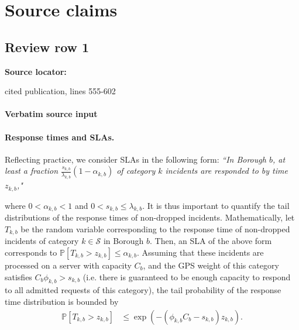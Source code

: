 \documentclass[10pt]{article}
\begin{document}
\clearpage
\hypertarget{source-claim-6542200f731a263b}{}
\hypertarget{source-section-f10b5f68e4acf3dc}{}
\section*{Source claims}
\subsection*{Review row 1}
\textbf{Source locator:} {\footnotesize\raggedright cited publication, lines 555-\allowbreak{}602\par}
\paragraph{Verbatim source input}
\begin{ReviewVerbatim}
\paragraph{Response times and SLAs.} Reflecting practice, we consider SLAs in the following form:
    \textit{``In Borough $b$, at least a fraction {$\frac{s_{k,b}}{\lambda_{k,b}}(1 -\alpha_{k,b})$} of category $k$ {incidents} are responded to by time $z_{k,b}$,"}

where $0<\alpha_{k,b}<1$ and $0<s_{k,b}\leq\lambda_{k,b}$. It is thus important to quantify the tail distributions of the response times of non-dropped incidents. Mathematically, let $T_{k,b}$ be the {random variable corresponding to the response time of non-dropped incidents of category $k\in \mathcal{S}$ in Borough $b$}. Then, an SLA of the above form corresponds to {$\mathbb{P}[T_{k,b} > z_{k,b}]\le \alpha_{k,b}$}. Assuming that these incidents are processed on a server with capacity $C_b$, and the GPS weight of this category satisfies $C_b\phi_{k,b}>{s_{k,b}}$ (i.e. there is guaranteed to be enough capacity to {respond to all admitted requests} of this category), the tail probability of the response time distribution is bounded by
\begin{equation}
\begin{aligned}
    {\mathbb{P}[T_{k,b}> z_{k,b}]}
    &\le \exp\left(-(\phi_{k,b} C_b-{s_{k,b}})z_{k,b}\right).
\end{aligned}
    \label{tail_prob}
\end{equation}





















\end{ReviewVerbatim}
\end{document}

